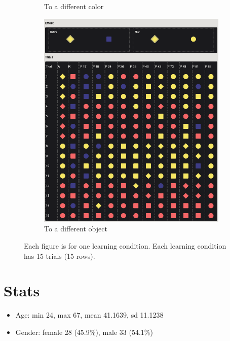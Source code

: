 \documentclass{article}
\begin{document}
\begin{figure}[h!]
\begin{subfigure}[t]{0.32\textwidth}
  	\caption{To a different color} \label{fig:learn04}
  \end{subfigure}
  \hfill
  \begin{subfigure}[t]{0.32\textwidth}
  	\centering
  	\includegraphics[width=\linewidth]{learn05} 
  	\caption{To a different object} \label{fig:learn05}
  \end{subfigure}
  \caption{Each figure is for one learning condition. 
  Each learning condition has 15 trials (15 rows).}
\end{figure}

\section{Stats}

\begin{itemize}
  \item Age: min 24, max 67, mean 41.1639, sd 11.1238 
  \item Gender: female 28 (45.9\%), male 33 (54.1\%)
\end{itemize}
\end{document}
